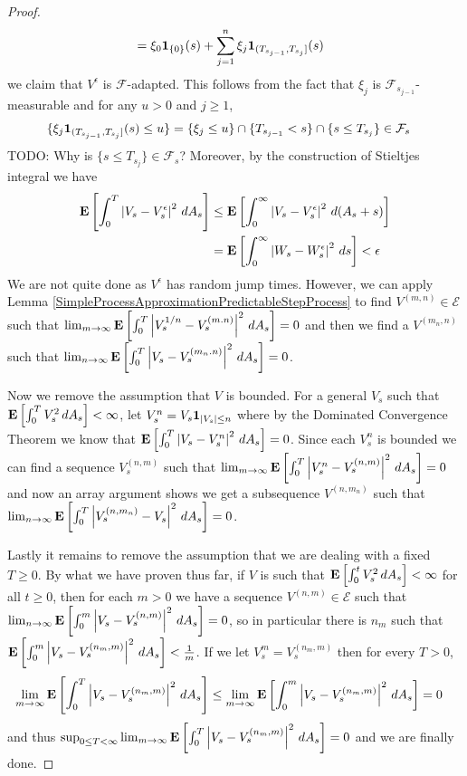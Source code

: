 \begin{proof}
\begin{align*}
&=\xi_0 \textbf{1}_{\lbrace 0 \rbrace}(s) + \sum_{j=1}^n \xi_j \textbf{1}_{(T_{s_{j-1}}, T_{s_j}]}(s) 
\end{align*}
we claim that $V^\epsilon$ is $\mathcal{F}$-adapted.  This follows from the fact that $\xi_j$ is $\mathcal{F}_{s_{j-1}}$-measurable and for any $u > 0$ and $j \geq 1$, 
\begin{align*}
\lbrace \xi_j \textbf{1}_{(T_{s_{j-1}}, T_{s_j}]}(s) \leq u \rbrace &= \lbrace \xi_j \leq u \rbrace \cap \lbrace T_{s_{j-1}} < s \rbrace \cap \lbrace s \leq T_{s_j}  \rbrace \in \mathcal{F}_s
\end{align*}
TODO: Why is $\lbrace s \leq T_{s_j}  \rbrace \in \mathcal{F}_s$?
Moreover, by the construction of Stieltjes integral we have
\begin{align*}
\textbf{E}\left[\int_0^T \left \vert V_s - V^\epsilon_s \right \vert^2 \, dA_s\right] &\leq \textbf{E}\left[\int_0^\infty \left \vert V_s - V^\epsilon_s \right \vert^2 \, d(A_s + s)\right] \\
&=\textbf{E}\left[\int_0^\infty \left \vert W_s - W^\epsilon_s \right \vert^2 \, ds\right] < \epsilon
\end{align*}
 We are not quite done as $V^\epsilon$ has random jump times.  However, we can apply Lemma \ref{SimpleProcessApproximationPredictableStepProcess} to find $V^{(m,n)} \in \mathcal{E}$ such that $\lim_{m \to \infty} \textbf{E}\left[\int_0^T \left \vert V^{1/n}_s -V^{(m.n)}_s \right \vert^2 \, dA_s\right] = 0$ and then we find a $V^{(m_n,n)}$ such that $\lim_{n \to \infty} \textbf{E}\left[\int_0^T \left \vert V_s -V^{(m_n.n)}_s \right \vert^2 \, dA_s\right] = 0$.

Now we remove the assumption that $V$ is bounded.  For a general $V_s$ such that $\textbf{E}\left[ \int_0^T V_s^2 \, dA_s\right] < \infty$, let $V^n_s = V_s \textbf{1}_{\left \vert V_s \right \vert \leq n}$ where by the Dominated Convergence Theorem we know that $\textbf{E}\left[ \int_0^T \left \vert V_s - V_s^n \right \vert^2 \, dA_s\right] = 0$.  Since each $V_s^n$ is bounded we can find a sequence $V^{(n,m)}_s$ such that $\lim_{m \to \infty} \textbf{E}\left[ \int_0^T \left \vert V^n_s - V_s^{(n,m)} \right \vert^2 \, dA_s\right] = 0$ and now an array argument shows we get a subsequence $V^{(n,m_n)}$ such that $\lim_{n \to \infty} \textbf{E}\left[ \int_0^T \left \vert V^{(n,m_n)}_s - V_s \right \vert^2 \, dA_s\right] = 0$.


Lastly it remains to remove the assumption that we are dealing with a fixed $T \geq 0$.  By what we have proven thus far, if $V$ is such that $\textbf{E}\left[ \int_0^t V_s^2 \, dA_s\right] < \infty$ for all $t \geq 0$, then for each $m > 0$ we have a sequence $V^{(n,m)} \in \mathcal{E}$ such that $\lim_{n \to \infty} \textbf{E}\left[\int_0^m \left \vert V_s - V^{(n,m)}_s \right \vert^2 \, dA_s\right] = 0$, so in particular there is $n_m$ such that $\textbf{E}\left[\int_0^m \left \vert V_s - V^{(n_m,m)}_s \right \vert^2 \, dA_s\right] < \frac{1}{m}$.  If we let $V_s^m = V_s^{(n_m,m)}$ then
for every $T > 0$, 
\begin{align*}
\lim_{m \to \infty} \textbf{E}\left[\int_0^T \left \vert V_s - V^{(n_m,m)}_s \right \vert^2 \, dA_s\right] &\leq \lim_{m \to \infty} \textbf{E}\left[\int_0^m \left \vert V_s - V^{(n_m,m)}_s \right \vert^2 \, dA_s\right] = 0
\end{align*}
and thus $\sup_{0 \leq T < \infty} \lim_{m \to \infty} \textbf{E}\left[\int_0^T \left \vert V_s - V^{(n_m,m)}_s \right \vert^2 \, dA_s\right] = 0$ and we are finally done.
\end{proof}
